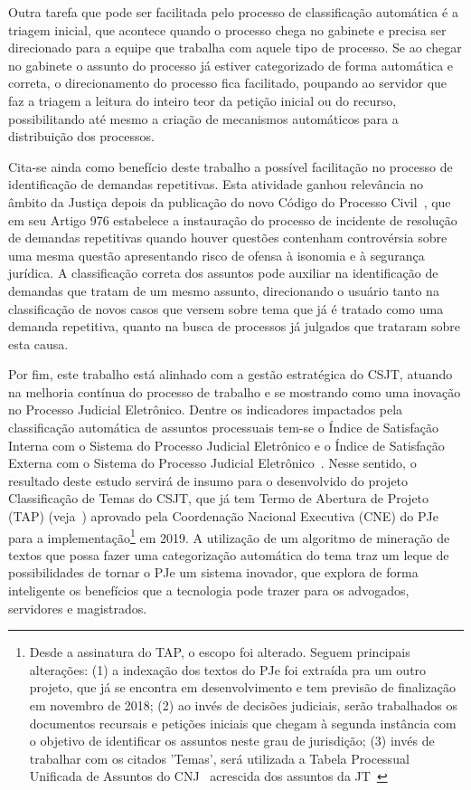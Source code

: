 Outra tarefa que pode ser facilitada pelo processo de classificação automática é a triagem inicial, que acontece quando o processo chega no gabinete e precisa ser direcionado para a equipe que trabalha com aquele tipo de processo. Se ao chegar no gabinete o assunto do processo já estiver categorizado de forma automática e correta, o direcionamento do processo fica facilitado, poupando ao servidor que faz a triagem a leitura do inteiro teor da petição inicial ou do recurso, possibilitando até mesmo a criação de mecanismos automáticos para a distribuição dos processos. 

Cita-se ainda como benefício deste trabalho a possível facilitação no processo de identificação de demandas repetitivas. Esta atividade ganhou relevância no âmbito da Justiça depois da publicação do novo Código do Processo Civil~\cite{novocpc}, que em seu Artigo 976 estabelece a instauração do processo de incidente de resolução de demandas repetitivas quando houver questões contenham controvérsia sobre uma mesma questão apresentando risco de ofensa à isonomia  e à segurança jurídica. A classificação correta dos assuntos pode auxiliar na identificação de demandas que tratam de um mesmo assunto, direcionando o usuário tanto na classificação de novos casos que versem sobre tema que já é tratado como uma demanda repetitiva, quanto na busca de processos já julgados que trataram sobre esta causa.


Por fim, este trabalho está alinhado com a gestão estratégica do CSJT, atuando na melhoria contínua do processo de trabalho e se mostrando como uma inovação no Processo Judicial Eletrônico. Dentre os indicadores impactados pela classificação automática de assuntos processuais tem-se o Índice de Satisfação Interna com o Sistema do Processo Judicial Eletrônico e o Índice de Satisfação Externa com o Sistema do Processo Judicial Eletrônico~\cite{conselho_superior_da_justica_do_trabalho_glossario_2017}. Nesse sentido, o resultado deste estudo servirá de insumo para o desenvolvido do projeto Classificação de Temas do CSJT, que já tem Termo de Abertura de Projeto (TAP) (veja~) aprovado pela Coordenação Nacional Executiva (CNE) do PJe para a implementação\footnote{Desde a assinatura do TAP, o escopo foi alterado. Seguem principais alterações: (1) a indexação dos textos do PJe foi extraída pra um outro projeto, que já se encontra em desenvolvimento e tem previsão de finalização em novembro de 2018; (2) ao invés de decisões judiciais, serão trabalhados os documentos recursais e petições iniciais que chegam à segunda instância com o objetivo de identificar os assuntos neste grau de jurisdição; (3) invés de trabalhar com os citados 'Temas', será utilizada a Tabela Processual Unificada de Assuntos do CNJ~\cite{tpucnj} acrescida dos assuntos da JT~\cite{tputst} } em 2019. 
A utilização de um algoritmo de mineração de textos que possa fazer uma categorização automática do tema traz um leque de possibilidades de tornar o PJe  um sistema inovador, que explora de forma inteligente os benefícios que a tecnologia pode trazer para os advogados, servidores e magistrados. 


